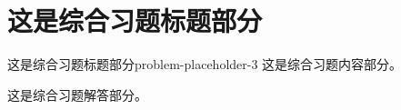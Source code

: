 \section{这是综合习题标题部分}

\begin{problem}{这是综合习题标题部分}{problem-placeholder-3}
    这是综合习题内容部分。
\end{problem}

\begin{solution}
    这是综合习题解答部分。
\end{solution}

\endinput
